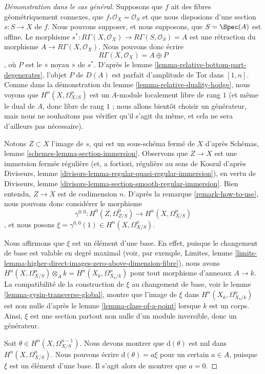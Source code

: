 \begin{proof}[Démonstration dans le cas général]
\medskip\noindent
Supposons que $f$ ait des fibres géométriquement connexes,
que $f_*\mathcal{O}_X = \mathcal{O}_S$ et que nous disposions
d'une section $s : S \to X$ de $f$. Nous pouvons supposer, et nous supposons, que $S = \Spec(A)$
est affine. Le morphisme
$s^* : R\Gamma(X, \mathcal{O}_X) \to R\Gamma(S, \mathcal{O}_S) = A$
est une rétraction du morphisme $A \to R\Gamma(X, \mathcal{O}_X)$. Nous pouvons donc écrire
$$
R\Gamma(X, \mathcal{O}_X) = A \oplus P
$$,
où $P$ est le « noyau » de $s^*$. D'après
le lemme \ref{lemma-relative-bottom-part-degenerates}, l'objet $P$
de $D(A)$ est parfait d'amplitude de Tor dans $[1, n]$. Comme dans la démonstration
du lemme \ref{lemma-relative-duality-hodge}, nous voyons que
$H^n(X, \Omega^n_{X/S})$ est un $A$-module localement libre de rang $1$
(et même le dual de $A$, donc libre de rang $1$ ; nous allons bientôt choisir
un générateur, mais nous ne souhaitons pas vérifier qu'il s'agit du même,
et cela ne sera d'ailleurs pas nécessaire).

\medskip\noindent
Notons $Z \subset X$ l'image de $s$, qui est un sous-schéma fermé de $X$ d'après
Schémas, lemme \ref{schemes-lemma-section-immersion}.
Observons que $Z \to X$ est une immersion fermée régulière (et, a fortiori, régulière au sens de Koszul d'après
Diviseurs, lemme \ref{divisors-lemma-regular-quasi-regular-immersion}),
en vertu de
Diviseurs, lemme \ref{divisors-lemma-section-smooth-regular-immersion}.
Bien entendu, $Z \to X$ est de codimension $n$. D'après
la remarque \ref{remark-how-to-use},
nous pouvons donc considérer le morphisme
$$
\gamma^{0, 0} : H^0(Z, \Omega^0_{Z/S}) \longrightarrow H^n(X, \Omega^n_{X/S})
$$,
et nous posons $\xi = \gamma^{0, 0}(1) \in H^n(X, \Omega^n_{X/S})$.

\medskip\noindent
Nous affirmons que $\xi$ est un élément d'une base. En effet, puisque le changement de base est valable
en degré maximal (voir, par exemple, Limites, lemme
\ref{limits-lemma-higher-direct-images-zero-above-dimension-fibre}),
nous avons
$H^n(X, \Omega^n_{X/S}) \otimes_A k = H^n(X_k, \Omega^n_{X_k/k})$
pour tout morphisme d'anneaux $A \to k$. La compatibilité de
la construction de $\xi$ au changement de base,
voir le lemme \ref{lemma-gysin-transverse-global},
montre que l'image de $\xi$ dans $H^n(X_k, \Omega^n_{X_k/k})$
est non nulle d'après le lemme \ref{lemma-class-of-a-point} lorsque $k$ est un corps.
Ainsi, $\xi$ est une section partout non nulle d'un module inversible,
donc un générateur.

\medskip\noindent
Soit $\theta \in H^n(X, \Omega^{n - 1}_{X/S})$. Nous devons montrer que
$\text{d}(\theta)$ est nul dans $H^n(X, \Omega^n_{X/S})$.
Nous pouvons écrire $\text{d}(\theta) = a \xi$ pour un certain $a \in A$,
puisque $\xi$ est un élément d'une base. Il s'agit alors de montrer que $a = 0$.


\end{proof}
